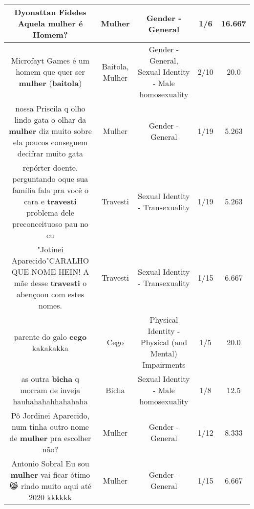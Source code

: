 \documentclass[11pt]{article}
\newlength\mylength
\begin{document}
\begin{center}
\begin{longtable}{|C{.65\mylength}|C{.30\mylength}|C{.12\mylength}|C{.12\mylength}|C{.12\mylength}|}
  \small Dyonattan Fideles Aquela \textbf{mulher} é Homem?\normalsize   & Mulher & Gender - General & 1/6 & 16.667 \\  \hline
  \small Microfayt Games  é um homem que quer ser \textbf{mulher} (\textbf{baitola})\normalsize   & Baitola, Mulher & Gender - General, Sexual Identity - Male homosexuality & 2/10 & 20.0 \\  \hline
  \small nossa Priscila q olho lindo gata o olhar da \textbf{mulher} diz muito sobre ela poucos conseguem decifrar muito gata\normalsize   & Mulher & Gender - General & 1/19 & 5.263 \\  \hline
  \small repórter doente. perguntando oque sua família fala pra você o cara e \textbf{travesti} problema dele preconceituoso pau no cu\normalsize   & Travesti & Sexual Identity - Transexuality & 1/19 & 5.263 \\  \hline
  \small "Jotinei Aparecido"CARALHO QUE NOME HEIN! A mãe desse \textbf{travesti} o abençoou com estes nomes.\normalsize   & Travesti & Sexual Identity - Transexuality & 1/15 & 6.667 \\  \hline
  \small parente do galo \textbf{cego} kakakakka\normalsize   & Cego & Physical Identity - Physical (and Mental) Impairments & 1/5 & 20.0 \\  \hline
  \small as outra \textbf{bicha} q morram de inveja hauhahahahhahahaha\normalsize   & Bicha & Sexual Identity - Male homosexuality & 1/8 & 12.5 \\  \hline
  \small Pô Jordinei Aparecido, num tinha outro nome de \textbf{mulher} pra escolher não?\normalsize   & Mulher & Gender - General & 1/12 & 8.333 \\  \hline
  \small Antonio Sobral Eu sou \textbf{mulher} vai ficar ótimo 😹 rindo muito aqui até 2020 kkkkkk\normalsize   & Mulher & Gender - General & 1/15 & 6.667 \\  \hline

\end{longtable}
\end{center}
\end{document}
